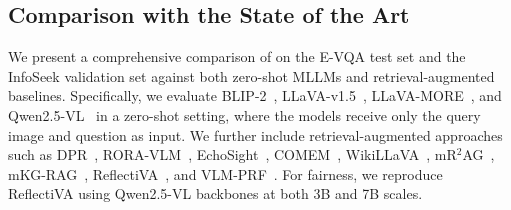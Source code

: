 \subsection{Comparison with the State of the Art}
\begin{table}[t]
\caption{VQA accuracy scores on Encyclopedic-VQA and InfoSeek with OMGM as retrieval modality.}
\label{tab:results3}
  \vspace{-0.25cm}
  \centering
  \setlength{\tabcolsep}{.25em}
\vspace{-0.25cm}
\end{table}


We present a comprehensive comparison of \ours on the E-VQA test set and the InfoSeek validation set against both zero-shot MLLMs and retrieval-augmented baselines. Specifically, we evaluate BLIP-2~\cite{li2023blip}, LLaVA-v1.5~\cite{liu2023improved}, LLaVA-MORE~\cite{cocchi2025llava}, and Qwen2.5-VL~\cite{bai2025qwen2} in a zero-shot setting, where the models receive only the query image and question as input. We further include retrieval-augmented approaches such as DPR~\cite{lerner2024cross}, RORA-VLM~\cite{qi2024rora}, EchoSight~\cite{yan2024echosight}, COMEM~\cite{wu2025towards}, WikiLLaVA~\cite{caffagni2024wiki}, mR$^\text{2}$AG~\cite{zhang2024mr}, mKG-RAG~\cite{yuan2025mkg}, ReflectiVA~\cite{cocchi2025augmenting}, and VLM-PRF~\cite{hong2025knowledge}. For fairness, we reproduce ReflectiVA using Qwen2.5-VL backbones at both 3B and 7B scales.

